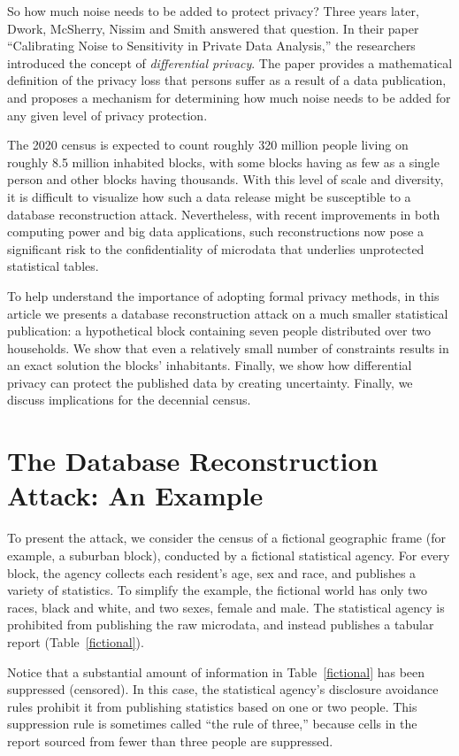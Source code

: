\documentclass[runningheads]{llncs}
\begin{document}
So how much noise needs to be added to protect privacy? Three years
later, Dwork, McSherry, Nissim and Smith answered that question. In
their paper ``Calibrating Noise to Sensitivity in Private Data
Analysis,''\cite{Dwork:2006:CNS:2180286.2180305} the researchers
introduced the concept of \emph{differential privacy}. The paper
provides a mathematical definition of the privacy loss that
persons suffer as a result of a data publication, and proposes a
mechanism for determining how much noise needs to be added for any
given level of privacy protection.

The 2020 census is expected to count roughly 320 million people living
on roughly 8.5 million inhabited blocks, with some blocks having as
few as a single person and other blocks having thousands. With this
level of scale and diversity, it is difficult to visualize how such a
data release might be susceptible to a database reconstruction
attack. Nevertheless, with recent improvements in both computing power
and big data applications, such reconstructions now pose a significant
risk to the confidentiality of microdata that underlies unprotected
statistical tables.

To help understand the importance of adopting formal privacy methods, in
this article we presents a database reconstruction attack on a much
smaller statistical publication: a hypothetical block containing seven
people distributed over two households. We show that even a relatively
small number of constraints results in an exact solution the blocks'
inhabitants. Finally, we show how differential privacy can protect the
published data by creating uncertainty. Finally, we discuss
implications for the decennial census.

\section{The Database Reconstruction Attack: An Example}

To present the attack, we consider the 
census of a fictional geographic frame (for example, a suburban block),
conducted by a fictional statistical
agency. For every block, the agency collects each resident's age,
sex and race, and publishes a variety of statistics. To simplify the example,
the fictional world has only two races, black and white, and two
sexes, female and male. The statistical agency
is prohibited from publishing the raw microdata, and instead publishes
a tabular report (Table~\ref{fictional}). 

Notice that a substantial amount of information in
Table~\ref{fictional} has been suppressed (censored). In this case,
the statistical agency's disclosure avoidance rules prohibit it from
publishing statistics based on one or two people. This suppression rule is
sometimes called ``the rule of three,'' because cells in the report
sourced from fewer than three people are suppressed.
\end{document}
